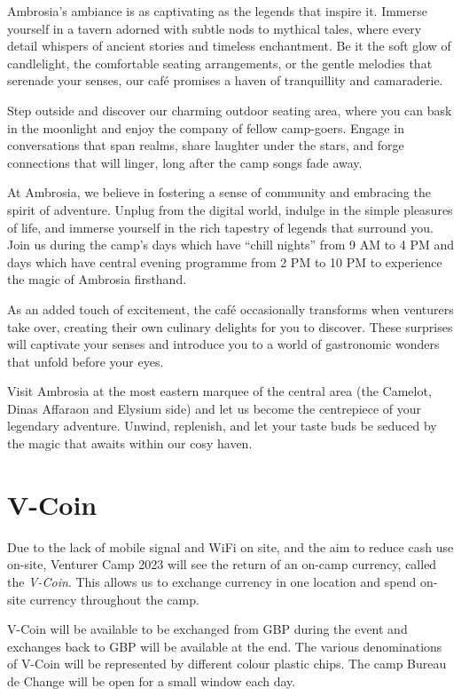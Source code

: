 \documentclass[a4paper, 11pt]{report}
\begin{document}
Ambrosia's ambiance is as captivating as the legends that inspire it. Immerse yourself in a tavern adorned with subtle nods to mythical tales, where every detail whispers of ancient stories and timeless enchantment. Be it the soft glow of candlelight, the comfortable seating arrangements, or the gentle melodies that serenade your senses, our café promises a haven of tranquillity and camaraderie.\nl

Step outside and discover our charming outdoor seating area, where you can bask in the moonlight and enjoy the company of fellow camp-goers. Engage in conversations that span realms, share laughter under the stars, and forge connections that will linger, long after the camp songs fade away.\nl

At Ambrosia, we believe in fostering a sense of community and embracing the spirit of adventure. Unplug from the digital world, indulge in the simple pleasures of life, and immerse yourself in the rich tapestry of legends that surround you. Join us during the camp's days which have “chill nights” from 9 AM to 4 PM and days which have central evening programme from 2 PM to 10 PM to experience the magic of Ambrosia firsthand.\nl

As an added touch of excitement, the café occasionally transforms when venturers take over, creating their own culinary delights for you to discover. These surprises will captivate your senses and introduce you to a world of gastronomic wonders that unfold before your eyes.\nl

Visit Ambrosia at the most eastern marquee of the central area (the Camelot, Dinas Affaraon and Elysium side) and let us become the centrepiece of your legendary adventure. Unwind, replenish, and let your taste buds be seduced by the magic that awaits within our cosy haven.

\chapter{V-Coin}
Due to the lack of mobile signal and WiFi on site, and the aim to reduce cash use on-site, Venturer Camp 2023 will see the return of an on-camp currency, called the \textit{V-Coin}. This allows us to exchange currency in one location and spend on-site currency throughout the camp.\nl

V-Coin will be available to be exchanged from GBP during the event and exchanges back to GBP will be available at the end. The various denominations of V-Coin will be represented by different colour plastic chips. The camp Bureau de Change will be open for a small window each day. \nl
\end{document}
